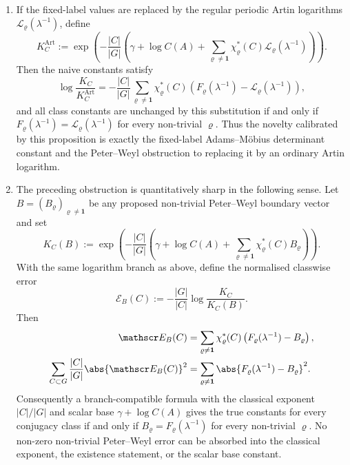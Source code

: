 \begin{remark}
\begin{enumerate}[label=\textup{(\Alph*)}]
    for every non-trivial \(\pi\).  Hence, after scalar normalisation, the
    full class-product constant vector is equivalent to the non-trivial
    fixed-label Perron vector.
    \item If the fixed-label values are replaced by the regular periodic
    Artin logarithms \(\mathcal L_\varrho(\lambda^{-1})\), define
    \[
      K_C^{\mathrm{Art}}
      :=
      \exp\!\left(
        -\frac{|C|}{|G|}
        \left(
          \gamma+\log C(A)
          +\sum_{\varrho\neq\mathbf1}
            \chi_\varrho^\ast(C)\mathcal L_\varrho(\lambda^{-1})
        \right)
      \right).
    \]
    Then the naive constants satisfy
    \begin{equation}\label{eq:comparison-artin-error}
      \log\frac{K_C}{K_C^{\mathrm{Art}}}
      =
      -\frac{|C|}{|G|}
        \sum_{\varrho\neq\mathbf1}
          \chi_\varrho^\ast(C)
          \left(F_\varrho(\lambda^{-1})-
          \mathcal L_\varrho(\lambda^{-1})\right),
    \end{equation}
    and all class constants are unchanged by this substitution if and only if
    \(F_\varrho(\lambda^{-1})=\mathcal L_\varrho(\lambda^{-1})\) for every
    non-trivial \(\varrho\).  Thus the novelty calibrated by this proposition
    is exactly the fixed-label Adams--M\"obius determinant constant and the
    Peter--Weyl obstruction to replacing it by an ordinary Artin logarithm.
    \item The preceding obstruction is quantitatively sharp in the following
    sense.  Let \(B=(B_\varrho)_{\varrho\ne\mathbf1}\) be any proposed
    non-trivial Peter--Weyl boundary vector and set
    \[
      K_C(B):=
      \exp\!\left(
        -\frac{|C|}{|G|}
        \left(
          \gamma+\log C(A)
          +\sum_{\varrho\neq\mathbf1}
            \chi_\varrho^\ast(C)B_\varrho
        \right)
      \right).
    \]
    With the same logarithm branch as above, define the normalised classwise
    error
    \[
      \mathscr E_B(C):=-\frac{|G|}{|C|}
        \log\frac{K_C}{K_C(B)}.
    \]
    Then
    \begin{equation}\label{eq:comparison-parseval-bound}
      \begin{aligned}
      \mathscr E_B(C)
      &=
      \sum_{\varrho\ne\mathbf1}
        \chi_\varrho^\ast(C)
        \left(F_\varrho(\lambda^{-1})-B_\varrho\right),\\
      \sum_{C\subset G}\frac{|C|}{|G|}\abs{\mathscr E_B(C)}^2
      &=
      \sum_{\varrho\ne\mathbf1}
        \abs{F_\varrho(\lambda^{-1})-B_\varrho}^2 .
      \end{aligned}
    \end{equation}
    Consequently a branch-compatible formula with the classical exponent
    \(|C|/|G|\) and scalar base \(\gamma+\log C(A)\) gives the true constants
    for every conjugacy class if and only if
    \(B_\varrho=F_\varrho(\lambda^{-1})\) for every non-trivial
    \(\varrho\).  No non-zero non-trivial Peter--Weyl error can be absorbed
    into the classical exponent, the existence statement, or the scalar base
    constant.
  \end{enumerate}
\end{remark}

